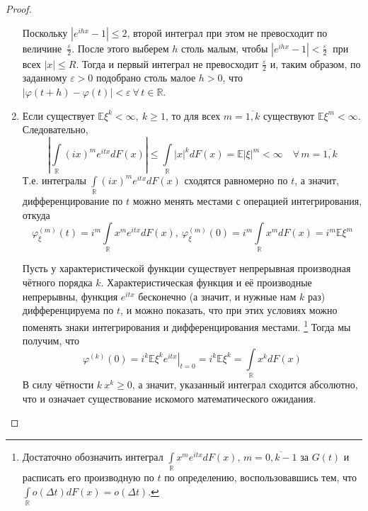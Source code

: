 \begin{proof}
\begin{enumerate}
            Поскольку $\left|e^{i h x}-1\right| \leqslant 2$, второй интеграл при этом не превосходит по величине~$\frac{\varepsilon}{2}$. 
            После этого выберем $h$ столь малым, чтобы $\left|e^{i h x}-1\right|<\frac{\varepsilon}{2}~$ при всех $|x| \leqslant R$. 
            Тогда и первый интеграл не превосходит $\frac{\varepsilon}{2}$ и, таким образом, по заданному $\varepsilon > 0$ подобрано столь малое $h >0$, что ${|\varphi(t+h)-\varphi(t)|<\varepsilon~ \forall \, t \in \mathbb{R}}$.
        \item 
            Если существует $\mathbb{E}\xi^{k}<\infty,~ k \geqslant 1$, то для всех $m = \overline{1, k}$ существуют $\mathbb{E}\xi^{m}<\infty$. Следовательно,
            \begin{equation*}
                \left|\int\limits_{\mathbb{R}}(i x)^{m} e^{i t x} d F(x)\right| \leqslant \int\limits_{\mathbb{R}}|x|^{k} d F(x)=\mathbb{E}|\xi|^{m}<\infty \quad \forall \, m = \overline{1, k}
            \end{equation*}
            Т.е. интегралы $\int\limits_{\mathbb{R}}(i x)^{m} e^{i t x} d F(x)$ сходятся равномерно по $t$, а значит, дифференцирование по $t$ можно менять местами с операцией интегрирования, откуда
            \begin{equation*}
                \varphi_{\xi}^{(m)}(t)=i^{m} \int\limits_{\mathbb{R}} x^{m} e^{i t x} d F(x),~ \varphi_{\xi}^{(m)}(0)=i^{m} \int\limits_{\mathbb{R}} x^{m} d F(x)=i^{m} \mathbb{E}\xi^{m}
            \end{equation*}
            
            Пусть у характеристической функции существует непрерывная производная чётного порядка $k$. 
            Характеристическая функция и её производные непрерывны, функция $e^{itx}$ бесконечно (а значит, и нужные нам $k$ раз) дифференцируема по $t$, 
            и можно показать, что при этих условиях можно поменять знаки интегрирования и дифференцирования местами.
            \footnote{Достаточно обозначить интеграл $\int\limits_{\mathbb{R}}{x^{m} e^{itx}dF(x)}, \, m = \overline{0, k-1}$ за $G(t)$ 
            и расписать его производную по $t$ по определению, воспользовавшись тем, что $\int\limits_{\mathbb{R}} o(\Delta t) dF(x) = o(\Delta t)$.}
            Тогда мы получим, что 
            $$ \varphi^{(k)}(0) = i^k \left.\mathbb{E}\xi^k e^{itx}\right|_{t=0} = i^k \mathbb{E}\xi^k = 
            \int\limits_{\mathbb{R}} x^k dF(x) $$
            В силу чётности $k ~ x^k \geqslant 0$, а значит, указанный интеграл сходится абсолютно, что и означает существование искомого математического ожидания.
    \end{enumerate}
\end{proof}

\pagebreak
